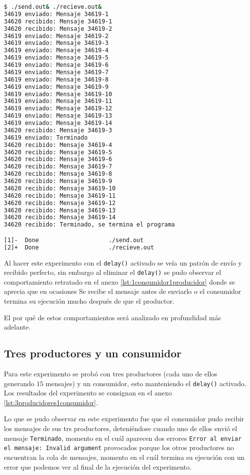 \begin{lstlisting}[language=bash, style=CodeStyle, caption=Un consumidor y un productor, label=lst:1consumidor1producidor]
$ ./send.out& ./recieve.out&
34619 enviado: Mensaje 34619-1
34620 recibido: Mensaje 34619-1
34620 recibido: Mensaje 34619-2
34619 enviado: Mensaje 34619-2
34619 enviado: Mensaje 34619-3
34619 enviado: Mensaje 34619-4
34619 enviado: Mensaje 34619-5
34619 enviado: Mensaje 34619-6
34619 enviado: Mensaje 34619-7
34619 enviado: Mensaje 34619-8
34619 enviado: Mensaje 34619-9
34619 enviado: Mensaje 34619-10
34619 enviado: Mensaje 34619-11
34619 enviado: Mensaje 34619-12
34619 enviado: Mensaje 34619-13
34619 enviado: Mensaje 34619-14
34620 recibido: Mensaje 34619-3
34619 enviado: Terminado
34620 recibido: Mensaje 34619-4
34620 recibido: Mensaje 34619-5
34620 recibido: Mensaje 34619-6
34620 recibido: Mensaje 34619-7
34620 recibido: Mensaje 34619-8
34620 recibido: Mensaje 34619-9
34620 recibido: Mensaje 34619-10
34620 recibido: Mensaje 34619-11
34620 recibido: Mensaje 34619-12
34620 recibido: Mensaje 34619-13
34620 recibido: Mensaje 34619-14
34620 recibido: Terminado, se termina el programa

[1]-  Done                    ./send.out
[2]+  Done                    ./recieve.out
\end{lstlisting}

Al hacer este experimento con el \texttt{delay()} activado se veía un patrón de envío y recibido perfecto, sin embargo al eliminar el \texttt{delay()} se pudo observar el comportamiento retratado en el anexo \ref{lst:1consumidor1producidor} donde se aprecia que en ocasiones Se recibe el mensaje antes de enviarlo o el consumidor termina su ejecución mucho después de que el productor.

El por qué de estos comportamientos será analizado en profundidad más adelante.

\subsection{Tres productores y un consumidor}
Para este experimento se probó con tres productores (cada uno de ellos generando $15$ mensajes) y un consumidor, esto manteniendo el \texttt{delay()} activado. Los resultados del experimento se consignan en el anexo \ref{lst:3producidores1consumidor}.

Lo que se pudo observar en este experimento fue que el consumidor pudo recibir los mensajes de sus trs productores, deteniéndose cuando uno de ellos envió el mensaje \texttt{Terminado}, momento en el cuál aparecen dos errores \texttt{Error al enviar el mensaje: Invalid argument} provocados porque los otros productores no encuentran la cola de mensajes, momento en el cuál termina su ejecución con un error que podemos ver al final de la ejecución del experimento.
